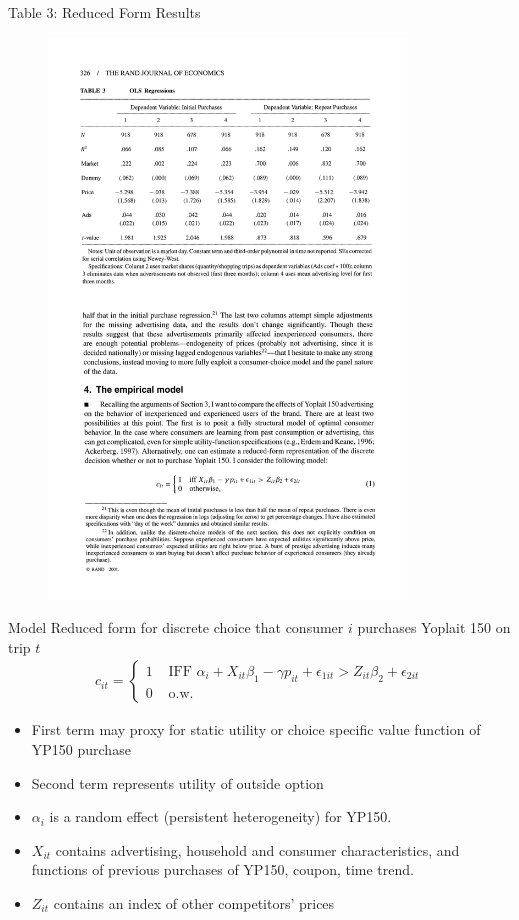\documentclass[xcolor=pdftex,dvipsnames,table,mathserif,aspectratio=169]{beamer}
\begin{document}
\begin{frame}{Table 3: Reduced Form Results}
\begin{figure}[htbp]
\begin{center}
\includegraphics[width=9.5cm]{resources/acker3.pdf}
\label{default}
\end{center}
\end{figure}
\end{frame}



\begin{frame}{Model}
Reduced form for discrete choice that consumer $i$ purchases Yoplait 150 on trip $t$
\begin{eqnarray*}
c_{it} = \begin{cases}
       1 & \mbox{ IFF } \alpha_i + X_{it} \beta_1 - \gamma p_{it} + \epsilon_{1it} > Z_{it} \beta_2 + \epsilon_{2it}\\
       0 & \mbox{ o.w. } 
        \end{cases}
\end{eqnarray*}
\begin{itemize}
\item First term may \alert{proxy} for static utility or choice specific value function of YP150 purchase
\item Second term represents utility of outside option
\item $\alpha_i$ is a random effect (persistent heterogeneity) for YP150.
\item $X_{it}$ contains \alert{advertising}, household and consumer characteristics, and functions of previous purchases of YP150, coupon, time trend.
\item $Z_{it}$ contains an index of other competitors' prices
\end{itemize}
\end{frame}
\end{document}
